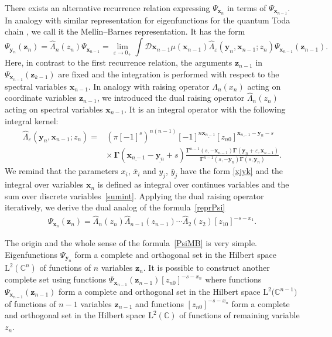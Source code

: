 \documentclass[10pt,a4paper]{amsart}
\numberwithin{equation}{section}
\begin{document}
There exists an alternative recurrence relation expressing
$\Psi_{\bm{x}_n}$ in terms of $\Psi_{\bm{x}_{n-1}}$.
In analogy with similar representation for eigenfunctions for
the quantum Toda chain \cite{KL1, KL2,KK}, we call it the Mellin--Barnes representation.
It has the form \cite{Val20}
\begin{equation} \label{PsiMB}
\Psi_{\bm{y}_n}(\bm{z}_n) = \hat{\Lambda}_n(z_n) \Psi_{\bm{x}_{n-1}} =
\lim\limits_{\varepsilon\to 0_+}
\int \mathcal{D}\bm{x}_{n-1}
\mu(\bm{x}_{n-1})
\hat{\Lambda}_\varepsilon(\bm{y}_{n},\bm{x}_{n-1}; z_n)
\Psi_{\bm{x}_{n-1}}(\bm{z}_{n-1}) .
\end{equation}
Here, in contrast to the first recurrence relation, the arguments $\bm{z}_{n-1}$ in $\Psi_{\bm{x}_{n-1}}(\bm z_{k-1})$ are fixed and the integration is performed with respect to the spectral variables $\bm{x}_{n-1}$.
In analogy with raising operator $\Lambda_n( x_n)$ acting on coordinate variables $\bm{z}_{n-1}$, we introduced the dual raising operator $\hat{\Lambda}_n(z_n)$ acting on
spectral variables $\bm{x}_{n-1}$.
It is an integral operator with the following integral kernel:
\begin{align}
\nonumber
\hat{\Lambda}_\varepsilon(\bm{y}_{n},\bm{x}_{n-1};z_n) ={}&
(\pi [-1]^{s})^{n(n-1)} [-1]^{n\underline{\bm{x}_{n-1}}}
[z_{n0}]^{\underline{\bm{x}_{n-1}}-\underline{\bm{y}_n}-s} \\
&\label{dual}
{\times}\,
\mathbf{\Gamma}(\underline{\bm{x}_{n-1}}-\underline{\bm{y}_n}+s) 	\frac{\mathbf{\Gamma}^{n-1}(s ,-\bm{x}_{n-1})
\mathbf{\Gamma}(\bm{y}_n+\varepsilon,\bm{x}_{n-1})}
{\mathbf{\Gamma}^{n-1}(s ,-\bm{y}_n) \mathbf{\Gamma}(s ,\bm{y}_n)} .
\end{align}
We remind that the parameters $x_i$, $\bar{x}_i$ and $y_j$, $\bar{y}_j$ have the form
\eqref{xjyk} and the integral over variables $\bm{x}_n$ is defined
as integral over continues variables and the sum over discrete variables~\eqref{sumint}.
Applying the dual raising operator iteratively, we derive
the dual analog of the formula~\eqref{reprPsi}
\begin{align*}
\Psi_{\bm{x}_n}(\bm z_n) =
\hat{\Lambda}_n( z_n)
\hat{\Lambda}_{n-1}( z_{n-1})\cdots
\hat{\Lambda}_{2}(z_{2}) [z_{10}]^{-s-x_1} .
\end{align*}

The origin and the whole sense of the formula~\eqref{PsiMB} is very simple.
Eigenfunctions $\Psi_{\bm{y}_n}$ form a complete and orthogonal set in the Hilbert space $\mathrm{L}^2(\mathbb{C}^n)$ of functions of $n$ variables $\bm{z}_n$.
It is possible to construct another complete set using functions $\Psi_{\bm{x}_{n-1}}(\bm{z}_{n-1}) [z_{n0}]^{-s-x_n}$ where functions $\Psi_{\bm{x}_{n-1}}(\bm{z}_{n-1})$ form a complete and orthogonal set in the Hilbert space $\mathrm{L}^2\bigl(\mathbb{C}^{n-1}\bigr)$ of functions of $n-1$ variables $\bm{z}_{n-1}$ and
functions $[z_{n0}]^{-s-x_n}$ form a complete and orthogonal set in the Hilbert space $\mathrm{L}^2(\mathbb{C})$ of functions of remaining variable $z_n$.
\end{document}
